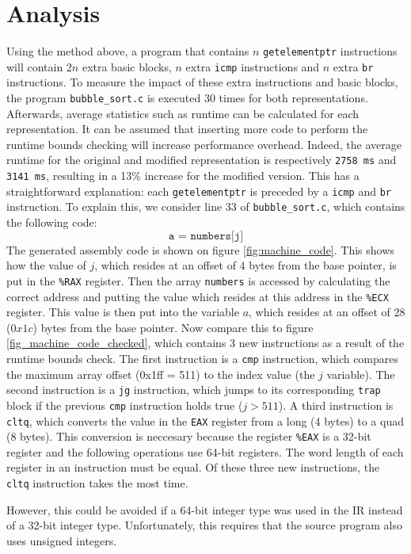 \documentclass{article}
\begin{document}
	\section{Analysis}
	Using the method above, a program that contains $n$ \texttt{getelementptr} instructions will contain $2n$ extra basic blocks, $n$ extra \texttt{icmp} instructions and $n$ extra \texttt{br} instructions. To measure the impact of these extra instructions and basic blocks, the program \texttt{bubble\_sort.c} is executed 30 times for both representations. Afterwards, average statistics such as runtime can be calculated for each representation. It can be assumed that inserting more code to perform the runtime bounds checking will increase performance overhead. Indeed, the average runtime for the original and modified representation is respectively \texttt{2758 ms} and \texttt{3141 ms}, resulting in a 13\% increase for the modified version. This has a straightforward explanation: each \texttt{getelementptr} is preceded by a \texttt{icmp} and \texttt{br} instruction. To explain this, we consider line 33 of \texttt{bubble\_sort.c}, which contains the following code:
	$$\texttt{a = numbers[j]}$$
 	The generated assembly code is shown on figure \ref{fig:machine_code}. This shows how the value of $j$, which resides at an offset of $4$ bytes from the base pointer, is put in the \texttt{\%RAX} register. Then the array \texttt{numbers} is accessed by calculating the correct address and putting the value which resides at this address in the \texttt{\%ECX} register. This value is then put into the variable $a$, which resides at an offset of 28 ($0x1c$) bytes from the base pointer. Now compare this to figure \ref{fig_machine_code_checked}, which contains 3 new instructions as a result of the runtime bounds check. The first instruction is a \texttt{cmp} instruction, which compares the maximum array offset (0x1ff = 511)  to the index value (the $j$ variable). The second instruction is a \texttt{jg} instruction, which jumps to its corresponding \texttt{trap} block if the previous \texttt{cmp} instruction holds true ($j > 511$). A third instruction is \texttt{cltq}, which converts the value in the \texttt{EAX} register from a long (4 bytes) to a quad (8 bytes). This conversion is neccesary because the register \texttt{\%EAX} is a 32-bit register and the following operations use 64-bit registers. The word length of each register in an instruction must be equal. Of these three new instructions, the \texttt{cltq} instruction takes the most time.
 	
 	 However, this could be avoided if a 64-bit integer type was used in the IR instead of a 32-bit integer type. Unfortunately, this requires that the source program also uses unsigned integers.
	
\end{document}
